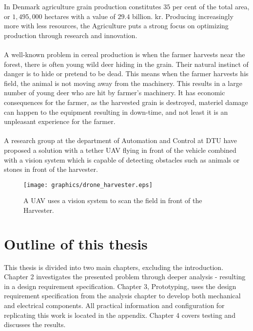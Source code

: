 In Denmark agriculture grain production constitutes $35$ per cent of the total area, or $1,495,000$ hectares with a value of $29.4$ billion. kr. Producing increasingly more with less resources, the Agriculture puts a strong focus on optimizing production through research and innovation\cite{FødevarerLandbrug2013}.
\\
\\
A well-known problem in cereal production is when the farmer harvests near the forest, there is often young wild deer hiding in the grain. Their natural instinct of danger is to hide or pretend to be dead. This means when the farmer harvests his field, the animal is not moving away from the machinery. This results in a large number of young deer who are hit by farmer’s machinery. It has economic consequences for the farmer, as the harvested grain is destroyed, materiel damage can happen to the equipment resulting in down-time, and not least it is an unpleasant experience for the farmer.
\\
\\
A research group at the department of Automation and Control at DTU have proposed a solution with a tether UAV flying in front of the vehicle combined with a vision system which is capable of detecting obstacles such as animals or stones in front of the harvester.

\begin{figure}[hbtp]
\centering
\texttt{[image: graphics/drone\_harvester.eps]}
\caption{A UAV uses a vision system to scan the field in front of the Harvester.}
\end{figure}


\section{Outline of this thesis}
This thesis is divided into two main chapters, excluding the introduction. Chapter 2 investigates the presented problem through deeper analysis - resulting in a design requirement specification. Chapter 3, Prototyping, uses the design requirement specification from the analysis chapter to develop both mechanical and electrical components. All practical information and configuration for replicating this work is located in the appendix. Chapter 4 covers testing and discusses the results.



